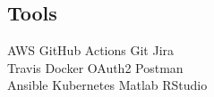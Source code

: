 \documentclass[]{deedy-resume-openfont}
\begin{document}
\begin{minipage}[t]{0.33\textwidth}
\subsection{Tools}
AWS \textbullet{} GitHub Actions \textbullet{} Git \textbullet{} Jira \\ 
\vspace{5pt}
Travis \textbullet{} Docker \textbullet{} OAuth2 \textbullet{} Postman \\
\vspace{5pt}
Ansible \textbullet{} Kubernetes \textbullet{} Matlab \textbullet{} RStudio

%
%

\end{minipage}
\hfill
\end{document}
